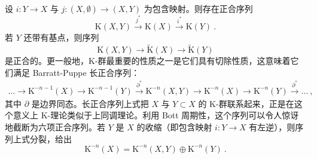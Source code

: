 \documentclass[11pt,a4paper]{ctexart}
\begin{document}
设 \(i:Y\rightarrow X\) 与 \(j:(X,\emptyset)\rightarrow (X,Y)\) 为包含映射。则存在正合序列 \[{\mathrm K}(X,Y)\stackrel{j^*}{\longrightarrow} {\mathrm K}(X)\stackrel{i^*}{\longrightarrow}
{\mathrm K}(Y)\ .\] 若 \(Y\) 还带有基点，则序列 \[{\mathrm K}(X,Y)\longrightarrow \widetilde{{\mathrm K}}(X)\longrightarrow \widetilde{{\mathrm K}}(Y)\] 是正合的。更一般地，K-群最重要的性质之一是它们具有切除性质，这意味着它们满足 Barratt-Puppe 长正合序列： \[\begin{matrix}
\ldots\longrightarrow{\mathrm K}^{-n-1}(X)\longrightarrow
{\mathrm K}^{-n-1}(Y)\stackrel{\partial^*}{\longrightarrow}
{\mathrm K}^{-n}(X,Y)\longrightarrow
{\mathrm K}^{-n}(X)\longrightarrow{\mathrm K}^{-n}(Y)
\stackrel{\partial^*}{\longrightarrow}\ldots\ ,
\end{matrix}\] 其中 \(\partial\) 是边界同态。长正合序列上式把 \(X\) 与 \(Y\subset X\) 的 K-群联系起来，正是在这个意义上 K-理论类似于上同调理论。利用 Bott 周期性，这个序列可以令人惊讶地截断为六项正合序列。若 \(Y\) 是 \(X\) 的收缩（即包含映射 \(i:Y\to X\) 有左逆），则序列上式分裂，给出 \[{\mathrm K}^{-n}(X)={\mathrm K}^{-n}(X,Y)\oplus{\mathrm K}^{-n}(Y)\ .\]
\end{document}
